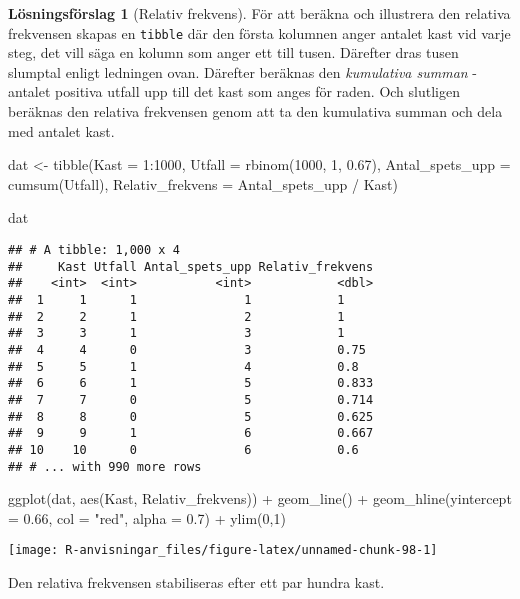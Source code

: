 \documentclass[
]{book}
\newenvironment{Shaded}{\begin{snugshade}}{\end{snugshade}}
\newcommand{\AttributeTok}[1]{\textcolor[rgb]{0.77,0.63,0.00}{#1}}
\newcommand{\DecValTok}[1]{\textcolor[rgb]{0.00,0.00,0.81}{#1}}
\newcommand{\FloatTok}[1]{\textcolor[rgb]{0.00,0.00,0.81}{#1}}
\newcommand{\FunctionTok}[1]{\textcolor[rgb]{0.00,0.00,0.00}{#1}}
\newcommand{\NormalTok}[1]{#1}
\newcommand{\OtherTok}[1]{\textcolor[rgb]{0.56,0.35,0.01}{#1}}
\newcommand{\SpecialCharTok}[1]{\textcolor[rgb]{0.00,0.00,0.00}{#1}}
\newcommand{\StringTok}[1]{\textcolor[rgb]{0.31,0.60,0.02}{#1}}
\theoremstyle{definition}
\theoremstyle{definition}
\theoremstyle{definition}
\theoremstyle{definition}
\newtheorem{hypothesis}{Lösningsförslag}[chapter]
\theoremstyle{remark}
\begin{document}
\begin{hypothesis}[Relativ frekvens]
För att beräkna och illustrera den relativa frekvensen skapas en \texttt{tibble} där den första kolumnen anger antalet kast vid varje steg, det vill säga en kolumn som anger ett till tusen. Därefter dras tusen slumptal enligt ledningen ovan. Därefter beräknas den \emph{kumulativa summan} - antalet positiva utfall upp till det kast som anges för raden. Och slutligen beräknas den relativa frekvensen genom att ta den kumulativa summan och dela med antalet kast.

\begin{Shaded}
\begin{Highlighting}[]
\NormalTok{dat }\OtherTok{\textless{}{-}} \FunctionTok{tibble}\NormalTok{(}\AttributeTok{Kast =} \DecValTok{1}\SpecialCharTok{:}\DecValTok{1000}\NormalTok{,}
              \AttributeTok{Utfall =} \FunctionTok{rbinom}\NormalTok{(}\DecValTok{1000}\NormalTok{, }\DecValTok{1}\NormalTok{, }\FloatTok{0.67}\NormalTok{),}
              \AttributeTok{Antal\_spets\_upp =} \FunctionTok{cumsum}\NormalTok{(Utfall),}
              \AttributeTok{Relativ\_frekvens =}\NormalTok{ Antal\_spets\_upp }\SpecialCharTok{/}\NormalTok{ Kast)}

\NormalTok{dat}
\end{Highlighting}
\end{Shaded}

\begin{verbatim}
## # A tibble: 1,000 x 4
##     Kast Utfall Antal_spets_upp Relativ_frekvens
##    <int>  <int>           <int>            <dbl>
##  1     1      1               1            1    
##  2     2      1               2            1    
##  3     3      1               3            1    
##  4     4      0               3            0.75 
##  5     5      1               4            0.8  
##  6     6      1               5            0.833
##  7     7      0               5            0.714
##  8     8      0               5            0.625
##  9     9      1               6            0.667
## 10    10      0               6            0.6  
## # ... with 990 more rows
\end{verbatim}

\begin{Shaded}
\begin{Highlighting}[]
\FunctionTok{ggplot}\NormalTok{(dat, }\FunctionTok{aes}\NormalTok{(Kast, Relativ\_frekvens)) }\SpecialCharTok{+}
  \FunctionTok{geom\_line}\NormalTok{() }\SpecialCharTok{+}
  \FunctionTok{geom\_hline}\NormalTok{(}\AttributeTok{yintercept =} \FloatTok{0.66}\NormalTok{, }\AttributeTok{col =} \StringTok{"red"}\NormalTok{, }\AttributeTok{alpha =} \FloatTok{0.7}\NormalTok{) }\SpecialCharTok{+}
  \FunctionTok{ylim}\NormalTok{(}\DecValTok{0}\NormalTok{,}\DecValTok{1}\NormalTok{)}
\end{Highlighting}
\end{Shaded}

\begin{center}\texttt{[image: R-anvisningar\_files/figure-latex/unnamed-chunk-98-1]} \end{center}

Den relativa frekvensen stabiliseras efter ett par hundra kast.
\end{hypothesis}
\end{document}
